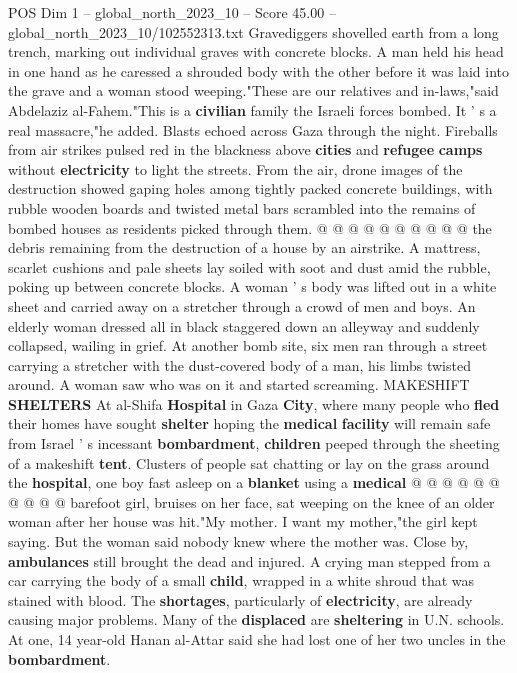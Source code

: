 \begin{textsample}{POS Dim 1 – global\_north\_2023\_10 – Score 45.00 – global\_north\_2023\_10/102552313.txt}
Gravediggers shovelled earth from a long trench, marking out individual graves with concrete blocks.
A man held his head in one hand as he caressed a shrouded body with the other before it was laid into the grave and a woman stood weeping."These are our relatives and in-laws,"said Abdelaziz al-Fahem."This is a \textbf{civilian} family the Israeli forces bombed.
It ' s a real massacre,"he added.
Blasts echoed across Gaza through the night.
Fireballs from air strikes pulsed red in the blackness above \textbf{cities} and \textbf{refugee} \textbf{camps} without \textbf{electricity} to light the streets.
From the air, drone images of the destruction showed gaping holes among tightly packed concrete buildings, with rubble wooden boards and twisted metal bars scrambled into the remains of bombed houses as residents picked through them. @ @ @ @ @ @ @ @ @ @ the debris remaining from the destruction of a house by an airstrike.
A mattress, scarlet cushions and pale sheets lay soiled with soot and dust amid the rubble, poking up between concrete blocks.
A woman ' s body was lifted out in a white sheet and carried away on a stretcher through a crowd of men and boys.
An elderly woman dressed all in black staggered down an alleyway and suddenly collapsed, wailing in grief.
At another bomb site, six men ran through a street carrying a stretcher with the dust-covered body of a man, his limbs twisted around.
A woman saw who was on it and started screaming.
MAKESHIFT \textbf{SHELTERS} At al-Shifa \textbf{Hospital} in Gaza \textbf{City}, where many people who \textbf{fled} their homes have sought \textbf{shelter} hoping the \textbf{medical} \textbf{facility} will remain safe from Israel ' s incessant \textbf{bombardment}, \textbf{children} peeped through the sheeting of a makeshift \textbf{tent}.
Clusters of people sat chatting or lay on the grass around the \textbf{hospital}, one boy fast asleep on a \textbf{blanket} using a \textbf{medical} @ @ @ @ @ @ @ @ @ @ barefoot girl, bruises on her face, sat weeping on the knee of an older woman after her house was hit."My mother.
I want my mother,"the girl kept saying.
But the woman said nobody knew where the mother was.
Close by, \textbf{ambulances} still brought the dead and injured.
A crying man stepped from a car carrying the body of a small \textbf{child}, wrapped in a white shroud that was stained with blood.
The \textbf{shortages}, particularly of \textbf{electricity}, are already causing major problems.
Many of the \textbf{displaced} are \textbf{sheltering} in U.N. schools.
At one, 14 year-old Hanan al-Attar said she had lost one of her two uncles in the \textbf{bombardment}.

\end{textsample}
